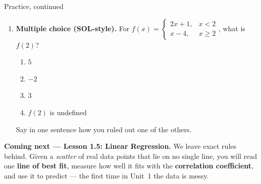 \documentclass[12pt]{article}
\begin{document}
\begin{notesbox}{Practice, continued}
\begin{enumerate}[leftmargin=1.9em, itemsep=8pt, start=4]
  \item \textbf{Multiple choice (SOL-style).} For
        $f(x)=\begin{cases} 2x+1, & x<2 \\ x-4, & x\ge2 \end{cases}$, what is $f(2)$?
    \begin{enumerate}[label=\Alph*., leftmargin=2.2em, itemsep=1pt]
      \item {}$5$
      \item $-2$
      \item $3$
      \item $f(2)$ is undefined
    \end{enumerate}
    Say in one sentence how you ruled out one of the others. 
\end{enumerate}
\end{notesbox}

\vspace{0.10in}

\boxguard[8]
\begin{spiralbox}
\small
\textbf{Coming next --- Lesson 1.5: Linear Regression.} We leave exact rules behind. Given a
\emph{scatter} of real data points that lie on no single line, you will read one \textbf{line of
best fit}, measure how well it fits with the \textbf{correlation coefficient}, and use it to
predict --- the first time in Unit~1 the data is messy.
\end{spiralbox}
\end{document}
